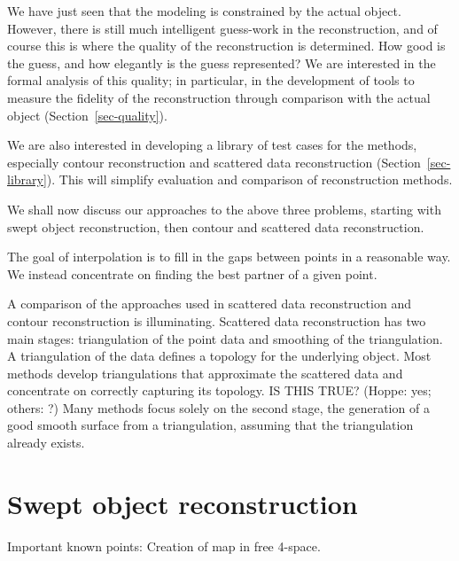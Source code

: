 We have just seen that the modeling is constrained by the actual object.
However, there is still much intelligent guess-work in the reconstruction,
and of course this is where the quality of the reconstruction is determined.
How good is the guess, and how elegantly is the guess represented?
We are interested in the formal analysis of this quality;
in particular, in the development of tools to measure the fidelity of the reconstruction
through comparison with the actual object (Section~\ref{sec-quality}).

We are also interested in developing a library of test cases
for the methods, especially contour reconstruction and
scattered data reconstruction (Section~\ref{sec-library}).
This will simplify evaluation and comparison of reconstruction methods.

We shall now discuss our approaches to the above three problems,
starting with swept object reconstruction, then contour and
scattered data reconstruction.

The goal of interpolation is to fill in the gaps between points in a reasonable way.
We instead concentrate on finding the best partner of a given point.














A comparison of the approaches used in scattered data reconstruction 
and contour reconstruction is illuminating.
Scattered data reconstruction has two main stages:
triangulation of the point data and smoothing of the triangulation.
A triangulation of the data defines a topology for the underlying object.
Most methods develop triangulations that approximate the scattered data
and concentrate on correctly capturing its topology.
IS THIS TRUE? (Hoppe: yes; others: ?)
Many methods focus solely on the second stage,
the generation of a good smooth surface from a triangulation, 
assuming that the triangulation already exists.


\section{Swept object reconstruction}

Important known points:
Creation of map in free 4-space.



